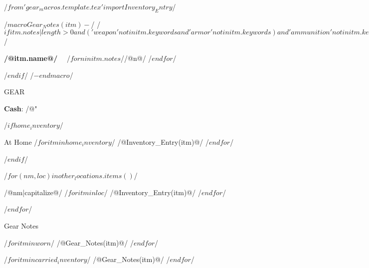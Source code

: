 /$from 'gear_macros.template.tex' import Inventory_Entry $/

/$ macro Gear_Notes(itm) -$/
/$if itm.notes|length>0 and ('weapon' not in itm.keywords and 
	'armor' not in itm.keywords) and 'ammunition' not in itm.keywords$/
\begin{minipage}{\columnwidth}
\noindent\textbf{ /@itm.name@/ }\ \ /$for n in itm.notes$//@n@/ /$endfor$/
\end{minipage}
/$endif$/
/$- endmacro $/

\centerline{\large GEAR }
\noindent \textbf{Cash}: /@"%


/$if home_inventory $/
\vspace*{8pt}\null
\begin{gearblock}{At Home}
/$ for itm in home_inventory $/
/@Inventory_Entry(itm)@/
/$ endfor $/
\end{gearblock}
/$endif$/

/$ for (nm,loc) in other_locations.items()$/
\vspace*{8pt}\null
\begin{gearblock}{/@nm|capitalize@/}
/$ for itm in loc $/
/@Inventory_Entry(itm)@/
/$ endfor $/
\end{gearblock}
/$ endfor $/
\vspace*{12pt}\null

\centerline{Gear Notes}
/$ for itm in worn $/
/@Gear_Notes(itm)@/
/$ endfor $/

/$ for itm in carried_inventory $/
/@Gear_Notes(itm)@/
/$ endfor $/
